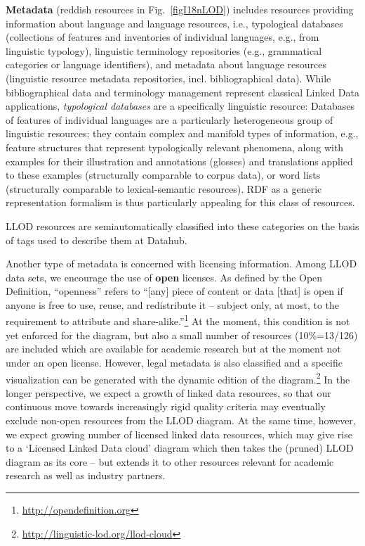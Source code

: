 \textbf{Metadata} (reddish resources in Fig.\ \ref{figI18nLOD}) includes resources providing information about language and language resources, 
i.e., typological databases (collections of features and inventories of individual languages, e.g., from linguistic typology), linguistic terminology repositories (e.g., grammatical categories or language identifiers), and metadata about language resources (linguistic resource metadata repositories, incl. bibliographical data).
While bibliographical data and terminology management represent classical Linked Data applications, \emph{typological databases} are a specifically linguistic resource:
Databases of features of individual languages are a particularly heterogeneous group of linguistic resources; they contain complex and manifold types of information, e.g., feature structures that represent typologically relevant phenomena, along with examples for their illustration and annotations (glosses) and translations applied to these examples (structurally comparable to corpus data), or word lists (structurally comparable to lexical-semantic resources). RDF as a generic representation formalism is thus particularly appealing for this class of resources.

LLOD resources are semiautomatically classified into these categories on the basis of tags used to describe them at Datahub.

Another type of metadata is concerned with licensing information. 
Among LLOD data sets, we encourage the use of \textbf{open} licenses. 
As defined by the Open Definition, ``openness'' refers to ``[any] piece of content or data [that] is open if anyone is free to use, reuse, and redistribute it -- subject only, at most, to the requirement to attribute and share-alike.''\footnote{\url{http://opendefinition.org}}
At the moment, this condition is not yet enforced for the diagram, but also a small number of resources (10\%=13/126) are included which are available for academic research but at the moment not under an open license.
However, legal metadata is also classified and a specific visualization can be generated with the dynamic edition of the diagram.\footnote{
	\url{http://linguistic-lod.org/llod-cloud}
}
In the longer perspective, we expect a growth of linked data resources, so that our continuous move towards increasingly rigid quality criteria may eventually exclude non-open resources from the LLOD diagram.
At the same time, however, we expect growing number of licensed linked data resources, which may give rise to a `Licensed Linked Data cloud' diagram which then takes the (pruned) LLOD diagram as its core -- but extends it to other resources relevant for academic research as well as industry partners.

